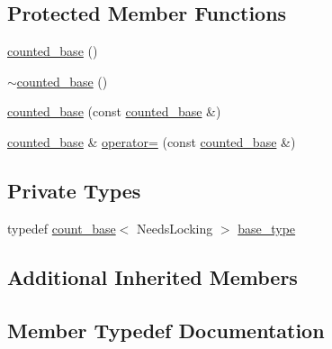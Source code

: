 \subsection*{Protected Member Functions}
\begin{DoxyCompactItemize}
\item 
\mbox{\hyperlink{classboost_1_1statechart_1_1detail_1_1counted__base_a47bad235fc3b18a57eefafa1e685c4e2}{counted\+\_\+base}} ()
\item 
\mbox{\hyperlink{classboost_1_1statechart_1_1detail_1_1counted__base_acdca8c95fbbfbaa0c514f1a59f1236cd}{$\sim$counted\+\_\+base}} ()
\item 
\mbox{\hyperlink{classboost_1_1statechart_1_1detail_1_1counted__base_aa3cedacab57a4eef2767c7de66f2c774}{counted\+\_\+base}} (const \mbox{\hyperlink{classboost_1_1statechart_1_1detail_1_1counted__base}{counted\+\_\+base}} \&)
\item 
\mbox{\hyperlink{classboost_1_1statechart_1_1detail_1_1counted__base}{counted\+\_\+base}} \& \mbox{\hyperlink{classboost_1_1statechart_1_1detail_1_1counted__base_a4b7bb95008578c9069bbecfb35f3786f}{operator=}} (const \mbox{\hyperlink{classboost_1_1statechart_1_1detail_1_1counted__base}{counted\+\_\+base}} \&)
\end{DoxyCompactItemize}
\subsection*{Private Types}
\begin{DoxyCompactItemize}
\item 
typedef \mbox{\hyperlink{structboost_1_1statechart_1_1detail_1_1count__base}{count\+\_\+base}}$<$ Needs\+Locking $>$ \mbox{\hyperlink{classboost_1_1statechart_1_1detail_1_1counted__base_acbd7bf2800a572f79c494f2efb9e98aa}{base\+\_\+type}}
\end{DoxyCompactItemize}
\subsection*{Additional Inherited Members}


\subsection{Member Typedef Documentation}
\mbox{\label{classboost_1_1statechart_1_1detail_1_1counted__base_acbd7bf2800a572f79c494f2efb9e98aa}} 
